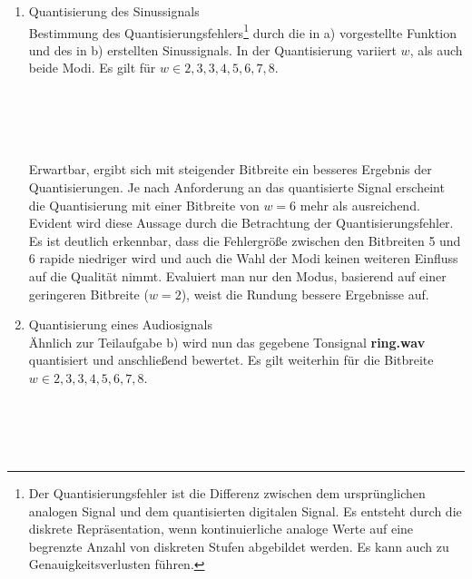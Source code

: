 \begin{enumerate}[label=\alph*)]
	\item Quantisierung des Sinussignals \\
	Bestimmung des Quantisierungsfehlers\footnote{Der Quantisierungsfehler ist die Differenz zwischen dem ursprünglichen analogen Signal und dem quantisierten digitalen Signal. Es entsteht durch die diskrete Repräsentation, wenn kontinuierliche analoge Werte auf eine begrenzte Anzahl von diskreten Stufen abgebildet werden. Es kann auch zu Genauigkeitsverlusten führen. } durch die in a) vorgestellte Funktion  und des in b) erstellten Sinussignals. In der Quantisierung variiert $w$, als auch beide Modi. Es gilt für $w \in {2,3,3,4,5,6,7,8}$.\\
	\vspace{-4pt}
	\vspace{4pt}
	\\\vspace{4pt}
	\\\vspace{4pt}
	\\\vspace{4pt}
	\\\vspace{4pt}
	
	Erwartbar, ergibt sich mit steigender Bitbreite ein besseres Ergebnis der Quantisierungen. Je nach Anforderung an das quantisierte Signal erscheint die Quantisierung mit einer Bitbreite von $w=6$ mehr als ausreichend. Evident wird diese Aussage durch die Betrachtung der Quantisierungsfehler. Es ist deutlich erkennbar, dass die Fehlergröße zwischen den Bitbreiten 5 und 6 rapide niedriger wird und auch die Wahl der Modi keinen weiteren Einfluss auf die Qualität nimmt. Evaluiert man nur den Modus, basierend auf einer geringeren Bitbreite ($w=2$), weist die Rundung bessere Ergebnisse auf.
	
	\item Quantisierung eines Audiosignals \\
	Ähnlich zur Teilaufgabe b) wird nun das gegebene Tonsignal \textbf{ring.wav} quantisiert und anschließend bewertet. Es gilt weiterhin für die Bitbreite $w \in {2,3,3,4,5,6,7,8}$. \\
	\vspace{4pt}
	\vspace{4pt}
	\\\vspace{4pt}
	\\\vspace{4pt}
	\\\vspace{4pt}
	\\\vspace{4pt}
	\vspace{-4pt}
	

\end{enumerate}
